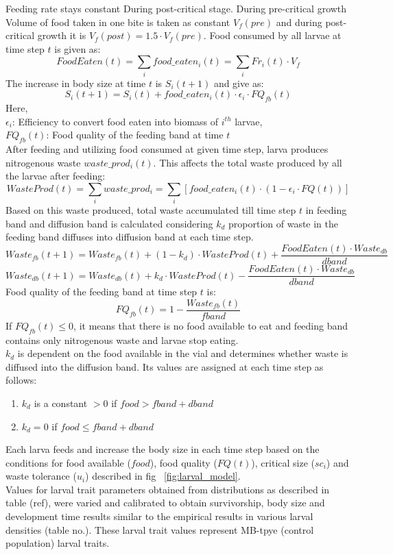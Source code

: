Feeding rate stays constant During post-critical stage. During pre-critical growth Volume of food taken in one bite is taken as constant $V_{f}(pre)$ and during post-critical growth it is $V_{f}(post) = 1.5\cdot V_{f}(pre)$. Food consumed by all larvae at time step $t$ is given as:
\[FoodEaten(t) = \sum_{i}food\_eaten_{i}(t) = \sum_{i}Fr_{i}(t)\cdot V_{f}\]
The increase in body size at time $t$ is $S_{i}(t+1)$ and give as:
\[S_{i}(t+1) = S_{i}(t) + food\_eaten_{i}(t)\cdot \epsilon_{i}\cdot FQ_{fb}(t)\]
Here,\\
$\epsilon_{i}$: Efficiency to convert food eaten into biomass of $i^{th}$ larvae,\\
$FQ_{fb}(t)$: Food quality of the feeding band at time $t$ \\
After feeding and utilizing food consumed at given time step, larva produces nitrogenous waste $waste\_prod_{i}(t)$. This affects the total waste produced by all the larvae after feeding:
\[WasteProd(t) = \sum_{i}waste\_prod_{i} = \sum_{i}[food\_eaten_{i}(t)\cdot (1-\epsilon_{i}\cdot FQ(t))]\]
Based on this waste produced, total waste accumulated till time step $t$ in feeding band and diffusion band is calculated considering $k_{d}$ proportion of waste in the feeding band diffuses into diffusion band at each time step.
\[Waste_{fb}(t+1) = Waste_{fb}(t) + (1-k_{d})\cdot WasteProd(t) + \frac{FoodEaten(t)\cdot Waste_{db}}{dband}\]
\[Waste_{db}(t+1) = Waste_{db}(t) + k_{d}\cdot WasteProd(t) - \frac{FoodEaten(t)\cdot Waste_{db}}{dband}\]
Food quality of the feeding band at time step $t$ is:
\[FQ_{fb}(t) = 1 - \frac{Waste_{fb}(t)}{fband}\]
If $FQ_{fb}(t) \leq 0 $, it means that there is no food available to eat and feeding band contains only nitrogenous waste and larvae stop eating.\\
$k_{d}$ is dependent on the food available in the vial and determines whether waste is diffused into the diffusion band. Its values are assigned at each time step as follows:
\begin{enumerate}[i]
  \item $k_{d}$ is a constant $> 0$ if $food > fband+dband$
  \item $k_{d} = 0$ if $food \leq fband+dband$
\end{enumerate}
Each larva feeds and increase the body size in each time step based on the conditions for food available ($food$), food quality ($FQ(t)$), critical size ($sc_{i}$) and waste tolerance ($u_{i}$) described in fig ~\ref{fig:larval_model}.\\
Values for larval trait parameters obtained from distributions as described in table (ref), were varied and calibrated to obtain survivorship, body size and development time results similar to the empirical results in various larval densities (table no.). These larval trait values represent MB-tpye (control population) larval traits.

